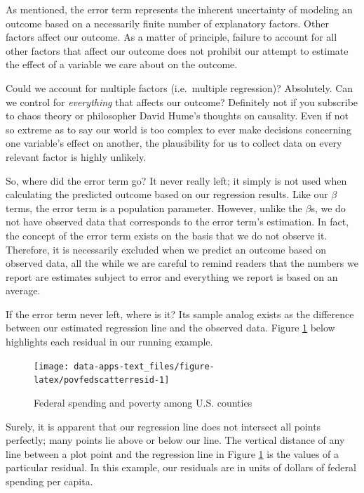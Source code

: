 \documentclass[
]{book}
\begin{document}
As mentioned, the error term represents the inherent uncertainty of modeling an outcome based on a necessarily finite number of explanatory factors. Other factors affect our outcome. As a matter of principle, failure to account for all other factors that affect our outcome does not prohibit our attempt to estimate the effect of a variable we care about on the outcome.

Could we account for multiple factors (i.e.~multiple regression)? Absolutely. Can we control for \emph{everything} that affects our outcome? Definitely not if you subscribe to chaos theory or philosopher David Hume's thoughts on causality. Even if not so extreme as to say our world is too complex to ever make decisions concerning one variable's effect on another, the plausibility for us to collect data on every relevant factor is highly unlikely.

So, where did the error term go? It never really left; it simply is not used when calculating the predicted outcome based on our regression results. Like our \(\beta\) terms, the error term is a population parameter. However, unlike the \(\beta\)s, we do not have observed data that corresponds to the error term's estimation. In fact, the concept of the error term exists on the basis that we do not observe it. Therefore, it is necessarily excluded when we predict an outcome based on observed data, all the while we are careful to remind readers that the numbers we report are estimates subject to error and everything we report is based on an average.

If the error term never left, where is it? Its sample analog exists as the difference between our estimated regression line and the observed data. Figure \ref{fig:povfedscatterresid} below highlights each residual in our running example.

\begin{figure}

{\centering \texttt{[image: data-apps-text\_files/figure-latex/povfedscatterresid-1]} 

}

\caption{Federal spending and poverty among U.S. counties}\label{fig:povfedscatterresid}
\end{figure}

Surely, it is apparent that our regression line does not intersect all points perfectly; many points lie above or below our line. The vertical distance of any line between a plot point and the regression line in Figure \ref{fig:povfedscatterresid} is the values of a particular residual. In this example, our residuals are in units of dollars of federal spending per capita.
\end{document}
